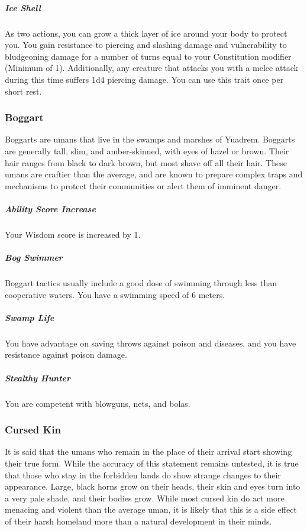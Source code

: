     \subparagraph{Ice Shell} As two actions, you can grow a thick layer of ice around your body to protect you.
    You gain resistance to piercing and slashing damage and vulnerability to bludgeoning damage for a number of turns equal to your Constitution modifier (Minimum of 1).
    Additionally, any creature that attacks you with a melee attack during this time suffers 1d4 piercing damage.
    You can use this trait once per short rest.

\subsubsection{Boggart}
    Boggarts are umans that live in the swamps and marshes of Yuadrem.
    Boggarts are generally tall, slim, and amber-skinned, with eyes of hazel or brown.
    Their hair ranges from black to dark brown, but most shave off all their hair.
    These umans are craftier than the average, and are known to prepare complex traps and mechanisms to protect their communities or alert them of imminent danger.

    \subparagraph{Ability Score Increase} Your Wisdom score is increased by 1.

    \subparagraph{Bog Swimmer} Boggart tactics usually include a good dose of swimming through less than cooperative waters.
    You have a swimming speed of 6 meters.

    \subparagraph{Swamp Life} You have advantage on saving throws against poison and diseases, and you have resistance against poison damage.

    \subparagraph{Stealthy Hunter} You are competent with blowguns, nets, and bolas.

\subsubsection{Cursed Kin}
    It is said that the umans who remain in the place of their arrival start showing their true form.
    While the accuracy of this statement remains untested, it is true that those who stay in the forbidden lands do show strange changes to their appearance.
    Large, black horns grow on their heads, their skin and eyes turn into a very pale shade, and their bodies grow.
    While most cursed kin do act more menacing and violent than the average uman, it is likely that this is a side effect of their harsh homeland more than a natural development in their minds.

